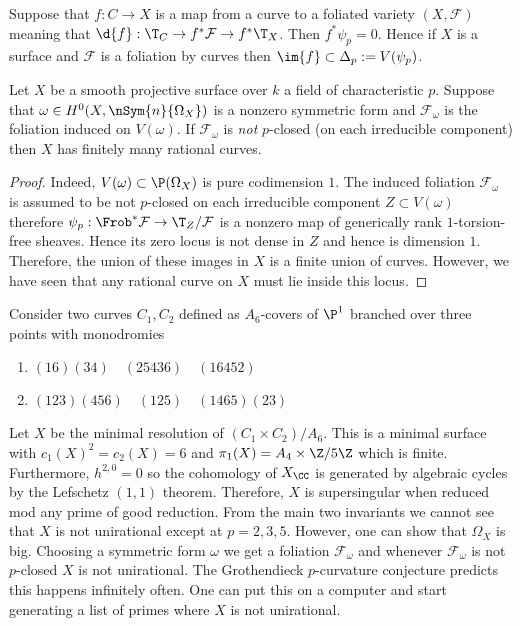 \documentclass[12pt]{article}
\renewcommand{\F}{\mathcal{F}}
\begin{document}
\begin{prop}
Suppose that $f : C \to X$ is a map from a curve to a foliated variety $(X, \F)$ meaning that $\d{f} : \T_C \to f^* \F \to f^* \T_X$. Then $f^* \psi_p = 0$. Hence if $X$ is a surface and $\F$ is a foliation by curves then $\im{f} \subset \Delta_p := V(\psi_p)$.
\end{prop}


\begin{theorem}
Let $X$ be a smooth projective surface over $k$ a field of characteristic $p$. Suppose that $\omega \in H^0(X, \nSym{n}{\Omega_X})$ is a nonzero symmetric form and $\F_{\omega}$ is the foliation induced on $V(\omega)$. If $\F_{\omega}$ is \textit{not} $p$-closed (on each irreducible component) then $X$ has finitely many rational curves.
\end{theorem}

\begin{proof}
Indeed, $V(\omega) \subset \P(\Omega_X)$ is pure codimension $1$. The induced foliation $\F_\omega$ is assumed to be not $p$-closed on each irreducible component $Z \subset V(\omega)$ therefore $\psi_p : \Frob^* \F \to \T_Z/\F$ is a nonzero map of generically rank $1$-torsion-free sheaves. Hence its zero locus is not dense in $Z$ and hence is dimension $1$. Therefore, the union of these images in $X$ is a finite union of curves. However, we have seen that any rational curve on $X$ must lie inside this locus.
\end{proof}

\begin{example}
Consider two curves $C_1, C_2$ defined as $A_6$-covers of $\P^1$ branched over three points with monodromies
\begin{enumerate}
\item $(1 6)(3 4) \quad (25436) \quad (16452)$
\item $(123)(456) \quad (125) \quad (1465)(23)$
\end{enumerate}
Let $X$ be the minimal resolution of $(C_1 \times C_2)/A_6$. This is a minimal surface with $c_1(X)^2 = c_2(X) = 6$ and $\pi_1(X) = A_4 \times \Z / 5 \Z$ which is finite. Furthermore, $h^{2,0} = 0$ so the cohomology of $X_{\CC}$ is generated by algebraic cycles by the Lefschetz $(1,1)$ theorem. Therefore, $X$ is supersingular when reduced mod any prime of good reduction. From the main two invariants we cannot see that $X$ is not unirational except at $p = 2,3,5$. However, one can show that $\Omega_X$ is big. Choosing a symmetric form $\omega$ we get a foliation $\F_\omega$ and whenever $\F_{\omega}$ is not $p$-closed $X$ is not unirational. The Grothendieck $p$-curvature conjecture predicts this happens infinitely often. One can put this on a computer and start generating a list of primes where $X$ is not unirational.  
\end{example}
\end{document}
